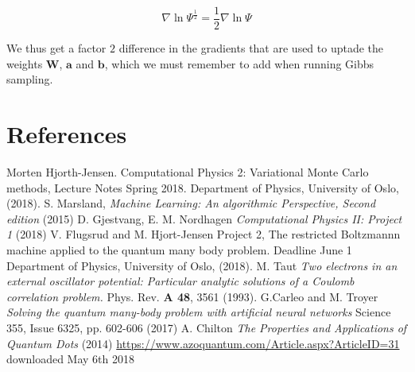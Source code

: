 \documentclass[norsk,a4paper,12pt]{article}
\begin{document}
\begin{equation}
	\nabla \ln \Psi^{\frac{1}{2}} = \frac{1}{2} \nabla \ln \Psi
\end{equation}

We thus get a factor $2$ difference in the gradients that are used to uptade the weights $\boldsymbol{W}$, $\boldsymbol{a}$ and $\boldsymbol{b}$, which we must remember to add when running Gibbs sampling.


\newpage
\section{References}

\begingroup
\renewcommand{\section}[2]{}
\begin{thebibliography}{}
	Morten Hjorth-Jensen.
	Computational Physics 2: Variational Monte Carlo methods, Lecture Notes Spring 2018.
	Department of Physics, University of Oslo,
	(2018).
	S. Marsland, \emph{Machine Learning: An algorithmic Perspective, Second edition} (2015)
	 D. Gjestvang, E. M. Nordhagen \emph{Computational Physics II: Project 1} (2018)
	 V. Flugsrud and M. Hjort-Jensen
	 Project 2, The restricted Boltzmannn machine applied to the quantum many body problem. Deadline June 1
	 Department of Physics, University of Oslo,
	 (2018).
	 M. Taut \emph{Two electrons in an external oscillator potential: Particular analytic solutions of a Coulomb correlation problem.} Phys. Rev. \textbf{A 48}, 3561 (1993).
	 G.Carleo and M. Troyer  \emph{Solving the quantum many-body problem with artificial neural networks} Science 355, Issue 6325, pp. 602-606 (2017)
	 A. Chilton \emph{The Properties and Applications of Quantum Dots} (2014) \url{https://www.azoquantum.com/Article.aspx?ArticleID=31} downloaded May 6th 2018

	
	
\end{thebibliography}
\endgroup
\end{document}
